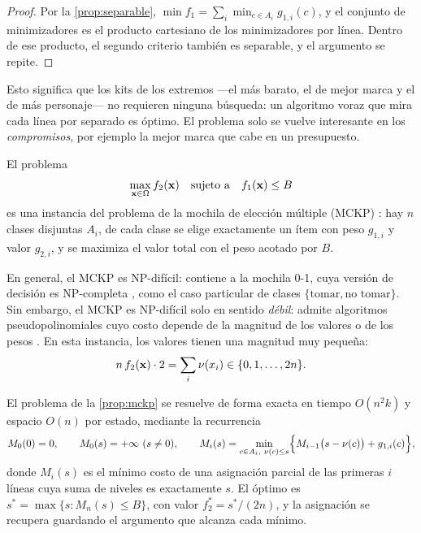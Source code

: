 \begin{proof}
Por la \cref{prop:separable}, $\min f_1=\sum_i\min_{c\in A_i}g_{1,i}(c)$, y
el conjunto de minimizadores es el producto cartesiano de los minimizadores
por línea. Dentro de ese producto, el segundo criterio también es separable,
y el argumento se repite.
\end{proof}

Esto significa que los kits de los extremos ---el más barato, el de mejor
marca y el de más personaje--- no requieren ninguna búsqueda: un algoritmo
voraz que mira cada línea por separado es óptimo. El problema solo se vuelve
interesante en los \emph{compromisos}, por ejemplo la mejor marca que cabe en
un presupuesto.

\begin{proposicion}
\label{prop:mckp}
El problema
\[
  \max_{\mathbf{x}\in\Omega} f_2(\mathbf{x})\quad\text{sujeto a}\quad f_1(\mathbf{x})\leq B
\]
es una instancia del problema de la mochila de elección múltiple (MCKP)
\cite{sinha1979mckp,kellerer2004}: hay $n$ clases disjuntas $A_i$, de cada
clase se elige exactamente un ítem con peso $g_{1,i}$ y valor
$g_{2,i}$, y se maximiza el valor total con el peso acotado por $B$.
\end{proposicion}

En general, el MCKP es NP-difícil: contiene a la mochila 0-1, cuya versión de
decisión es NP-completa \cite{garey1979}, como el caso particular de clases
$\{\text{tomar}, \text{no tomar}\}$. Sin embargo, el MCKP es NP-difícil solo en
sentido \emph{débil}: admite algoritmos pseudopolinomiales cuyo costo depende
de la magnitud de los valores o de los pesos \cite{kellerer2004}. En esta
instancia, los valores tienen una magnitud muy pequeña:
\[
  n\,f_2(\mathbf{x})\cdot 2=\sum_i\nu(x_i)\in\{0,1,\dots,2n\}.
\]

\begin{teorema}
\label{teo:mckp-poli}
El problema de la \cref{prop:mckp} se resuelve de forma exacta en tiempo
$O(n^2k)$ y espacio $O(n)$ por estado, mediante la recurrencia
\[
  M_0(0)=0,\qquad M_0(s)=+\infty\ (s\neq0),\qquad
  M_i(s)=\min_{c\in A_i,\ \nu(c)\leq s}\Bigl\{M_{i-1}\bigl(s-\nu(c)\bigr)+g_{1,i}(c)\Bigr\},
\]
donde $M_i(s)$ es el mínimo costo de una asignación parcial de las primeras
$i$ líneas cuya suma de niveles es exactamente $s$. El óptimo es
$s^\ast=\max\{s : M_n(s)\leq B\}$, con valor $f_2^\ast=s^\ast/(2n)$, y la
asignación se recupera guardando el argumento que alcanza cada mínimo.
\end{teorema}


